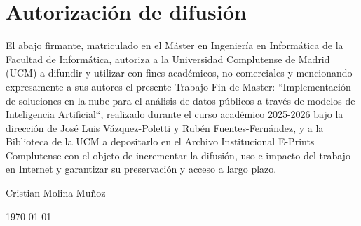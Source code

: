\chapter*{Autorización de difusión}

   
El abajo firmante, matriculado en el Máster en Ingeniería en Informática de la Facultad de Informática, autoriza a la Universidad Complutense de Madrid (UCM) a difundir y utilizar con fines académicos, no comerciales y mencionando expresamente a sus autores el presente Trabajo Fin de Master: ``Implementación de soluciones en la nube para el análisis de datos públicos a través de modelos de Inteligencia Artificial``, realizado durante el curso académico 2025-2026 bajo la dirección de José Luis Vázquez-Poletti y Rubén Fuentes-Fernández, y a la Biblioteca de la UCM a depositarlo en el Archivo Institucional E-Prints Complutense con el objeto de incrementar la difusión, uso e impacto del trabajo en Internet y garantizar su preservación y acceso a largo plazo.

\vspace{5cm}

\begin{center}
	\large Cristian Molina Muñoz\\
	
	\vspace{0.5cm}
	
	
	\today\\
	
\end{center}
